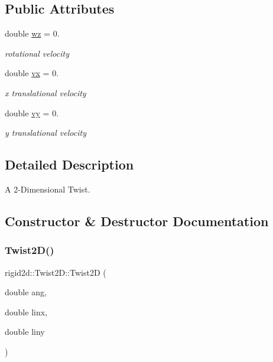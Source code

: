 \subsection*{Public Attributes}
\begin{DoxyCompactItemize}
\item 
\mbox{\label{structrigid2d_1_1Twist2D_ad556d2a04f31e2c5d8f4b45484782429}} 
double \hyperlink{structrigid2d_1_1Twist2D_ad556d2a04f31e2c5d8f4b45484782429}{wz} = 0.
\begin{DoxyCompactList}\small\item\em rotational velocity \end{DoxyCompactList}\item 
\mbox{\label{structrigid2d_1_1Twist2D_a95d7a5655df76416261f48346f549700}} 
double \hyperlink{structrigid2d_1_1Twist2D_a95d7a5655df76416261f48346f549700}{vx} = 0.
\begin{DoxyCompactList}\small\item\em x translational velocity \end{DoxyCompactList}\item 
\mbox{\label{structrigid2d_1_1Twist2D_abe86f0f1d0c00e42e5b388ca676e43dd}} 
double \hyperlink{structrigid2d_1_1Twist2D_abe86f0f1d0c00e42e5b388ca676e43dd}{vy} = 0.
\begin{DoxyCompactList}\small\item\em y translational velocity \end{DoxyCompactList}\end{DoxyCompactItemize}


\subsection{Detailed Description}
A 2-\/\+Dimensional Twist. 

\subsection{Constructor \& Destructor Documentation}
\mbox{\label{structrigid2d_1_1Twist2D_a957e7c727d48e4d2b3f6c2390533e1bb}} 
\subsubsection{\texorpdfstring{Twist2\+D()}{Twist2D()}}
{\footnotesize\ttfamily rigid2d\+::\+Twist2\+D\+::\+Twist2D (\begin{DoxyParamCaption}\item[{double}]{ang,  }\item[{double}]{linx,  }\item[{double}]{liny }\end{DoxyParamCaption})}




